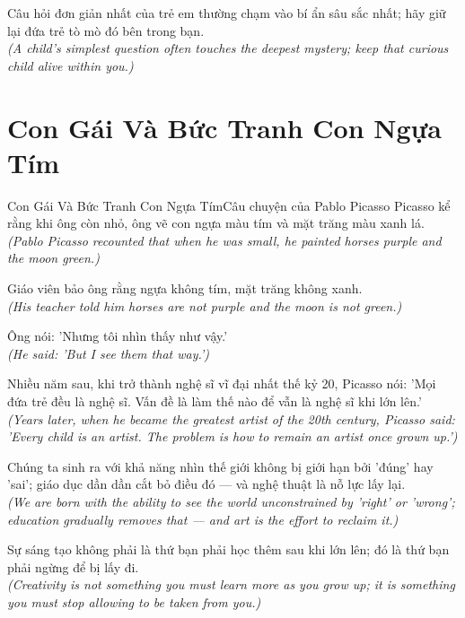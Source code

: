 \begin{baihoc}
  Câu hỏi đơn giản nhất của trẻ em thường chạm vào bí ẩn sâu sắc nhất; hãy giữ lại đứa trẻ tò mò đó bên trong bạn.\\[4pt]
  \textit{(A child's simplest question often touches the deepest mystery; keep that curious child alive within you.)}
\end{baihoc}

\section{Con Gái Và Bức Tranh Con Ngựa Tím}
\begin{truyen}{Con Gái Và Bức Tranh Con Ngựa Tím}{Câu chuyện của Pablo Picasso}
 Picasso kể rằng khi ông còn nhỏ, ông vẽ con ngựa màu tím và mặt trăng màu xanh lá.\\[4pt]
\textit{(Pablo Picasso recounted that when he was small, he painted horses purple and the moon green.)}

Giáo viên bảo ông rằng ngựa không tím, mặt trăng không xanh.\\[4pt]
\textit{(His teacher told him horses are not purple and the moon is not green.)}

Ông nói: 'Nhưng tôi nhìn thấy như vậy.'\\[4pt]
\textit{(He said: 'But I see them that way.')}

Nhiều năm sau, khi trở thành nghệ sĩ vĩ đại nhất thế kỷ 20, Picasso nói: 'Mọi đứa trẻ đều là nghệ sĩ. Vấn đề là làm thế nào để vẫn là nghệ sĩ khi lớn lên.'\\[4pt]
\textit{(Years later, when he became the greatest artist of the 20th century, Picasso said: 'Every child is an artist. The problem is how to remain an artist once grown up.')}

Chúng ta sinh ra với khả năng nhìn thế giới không bị giới hạn bởi 'đúng' hay 'sai'; giáo dục dần dần cắt bỏ điều đó --- và nghệ thuật là nỗ lực lấy lại.\\[4pt]
\textit{(We are born with the ability to see the world unconstrained by 'right' or 'wrong'; education gradually removes that --- and art is the effort to reclaim it.)}

\end{truyen}
\begin{baihoc}
  Sự sáng tạo không phải là thứ bạn phải học thêm sau khi lớn lên; đó là thứ bạn phải ngừng để bị lấy đi.\\[4pt]
  \textit{(Creativity is not something you must learn more as you grow up; it is something you must stop allowing to be taken from you.)}
\end{baihoc}


